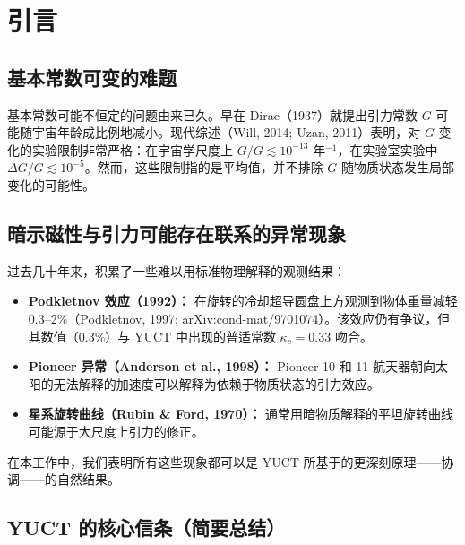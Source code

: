 \documentclass[12pt]{article}
\theoremstyle{remark}
\newcommand{\kappac}{\kappa_c}
\begin{document}
	\tableofcontents
	\newpage
	
	\section{引言}
	\label{sec:intro}
	
	\subsection{基本常数可变的难题}
	\label{subsec:constants-variation}
	
	基本常数可能不恒定的问题由来已久。早在 Dirac（1937）就提出引力常数 $G$ 可能随宇宙年龄成比例地减小。现代综述（Will, 2014; Uzan, 2011）表明，对 $G$ 变化的实验限制非常严格：在宇宙学尺度上 $\dot{G}/G \lesssim 10^{-13}$ 年$^{-1}$，在实验室实验中 $\Delta G/G \lesssim 10^{-5}$。然而，这些限制指的是平均值，并不排除 $G$ 随物质状态发生局部变化的可能性。
	
	\subsection{暗示磁性与引力可能存在联系的异常现象}
	\label{subsec:anomalies}
	
	过去几十年来，积累了一些难以用标准物理解释的观测结果：
	\begin{itemize}
		\item \textbf{Podkletnov 效应（1992）：} 在旋转的冷却超导圆盘上方观测到物体重量减轻 0.3–2\%（Podkletnov, 1997; arXiv:cond-mat/9701074）。该效应仍有争议，但其数值（0.3\%）与 YUCT 中出现的普适常数 $\kappac = 0.33$ 吻合。
		\item \textbf{Pioneer 异常（Anderson et al., 1998）：} Pioneer 10 和 11 航天器朝向太阳的无法解释的加速度可以解释为依赖于物质状态的引力效应。
		\item \textbf{星系旋转曲线（Rubin \& Ford, 1970）：} 通常用暗物质解释的平坦旋转曲线可能源于大尺度上引力的修正。
	\end{itemize}
	在本工作中，我们表明所有这些现象都可以是 YUCT 所基于的更深刻原理——协调——的自然结果。
	
	\subsection{YUCT 的核心信条（简要总结）}
	\label{subsec:yuct-core}
	
\end{document}
